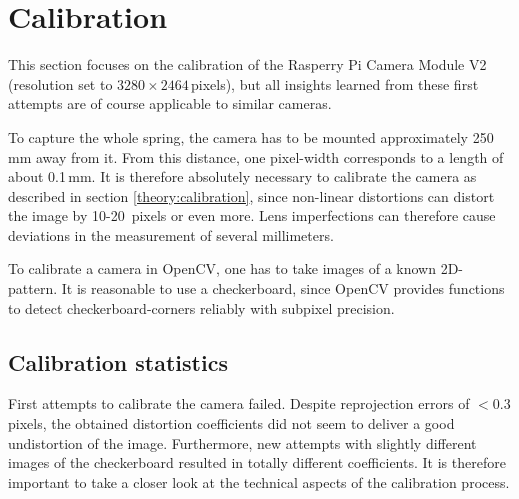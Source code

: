 \section{Calibration}
This section focuses on the calibration of the Rasperry Pi Camera Module V2 (resolution set to $3280\times 2464$\,pixels),
but all insights learned from these first attempts are of course applicable to similar cameras.

To capture the whole spring, the camera has to be mounted approximately 250\,mm away from it.
From this distance, one pixel-width corresponds to a length of about 0.1\,mm.
It is therefore absolutely necessary to calibrate the camera as described in section \ref{theory:calibration}, since non-linear distortions can distort the image by 10-20\, pixels or even more.
Lens imperfections can therefore cause deviations in the measurement of several millimeters.

To calibrate a camera in OpenCV, one has to take images of a known 2D-pattern.
It is reasonable to use a checkerboard, since OpenCV provides functions to detect checkerboard-corners reliably with subpixel precision.

\subsection{Calibration statistics\label{development:statistics}}
First attempts to calibrate the camera failed.
Despite reprojection errors of $<0.3$ pixels, the obtained distortion coefficients did not seem to deliver a good undistortion of the image.
Furthermore, new attempts with slightly different images of the checkerboard resulted in totally different coefficients. 
It is therefore important to take a closer look at the technical aspects of the calibration process.

